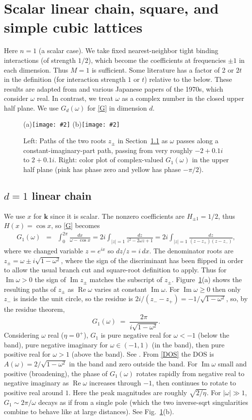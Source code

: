 \documentclass[11pt]{article}
\newcommand{\be}{\begin{equation}}
\newcommand{\ee}{\end{equation}}
\newcommand{\bea}{\begin{eqnarray}}
\newcommand{\eea}{\end{eqnarray}}
\newcommand{\bfi}{\begin{figure}}
\newcommand{\efi}{\end{figure}}
\newcommand{\ca}[2]{\caption{#1 \label{#2}}}
\newcommand{\ig}[2]{\texttt{[image: \#2]}}
\newcommand{\mbf}[1]{{\mathbf #1}}
\DeclareMathOperator{\re}{Re}
\DeclareMathOperator{\im}{Im}
\newcommand{\om}{\omega}
\newcommand{\kk}{\mbf{k}}
\begin{document}
\section{Scalar linear chain, square, and simple cubic lattices}

Here $n=1$ (a scalar case). We take fixed
nearest-neighbor tight binding interactions (of strength $1/2$), which become
the coefficients at frequencies $\pm 1$ in each dimension.
Thus $M=1$ is sufficient.
Some literature has
a factor of 2 or $2t$ in the definition (for interaction strength $1$ or $t$) relative to the below.
These results are adapted from \cite[Ch.~5]{economou}
and various Japanese papers of the 1970s, which consider $\om$ real.
In contrast, we treat $\om$ as a complex number in the closed
upper half plane.
We use $G_d(\om)$ for \eqref{G} in dimension $d$.


\bfi %
(a)\ig{width=2.8in}{zpaths}    %
(b)\ig{width=3.2in}{1dband_cplane}
\ca{Left: Paths of the two roots $z_\pm$ in Section~\ref{s:1d} as
  $\om$ passes along a constant-imaginary-part
  path, passing from very roughly $-2+0.1i$ to $2+0.1i$.
  Right: color plot of complex-valued $G_1(\om)$ in the upper half plane
  (pink has phase zero and yellow has phase $-\pi/2$).
}{f:1d}
\efi

\subsection{$d=1$ linear chain}
\label{s:1d}

We use $x$ for $\kk$ since it is scalar.
The nonzero coefficients are $H_{\pm 1} = 1/2$,
thus $H(x) = \cos x$,
so \eqref{G} becomes
\bea
G_1(\om) &=& \int_0^{2\pi} \frac{dx}{\om - \cos x}
= 2i \int_{|z|=1} \frac{dz}{z^2-2\om z + 1}
= 2i \int_{|z|=1} \frac{dz}{(z-z_+)(z-z_-)},
\label{G1def}
\eea
where we changed variable $z = e^{ix}$ so $dz/z = i\,dx$.
The denominator roots are $z_\pm = \om\pm i\sqrt{1-\om^2}$, where
the sign of the discriminant has been flipped in order to allow
the usual branch cut and square-root definition to apply.
Thus for $\im \om > 0$ the sign of $\im z_\pm$
matches the subscript of $z_\pm$.
Figure~\ref{f:1d}(a) shows the resulting paths of $z_\pm$ as $\re \om$
varies at constant $\im \om$.
For $\im \om \ge 0$ then only $z_-$ is inside the unit circle, so
the residue is $2i/(z_--z_+) = -1/\sqrt{1-\om^2}$, so, by
the residue theorem,
\be
G_1(\om) \;=\; \frac{2\pi}{i \sqrt{1-\om^2}}.
\label{G1}
\ee
Considering $\om$ real ($\eta=0^+$),
$G_1$ is pure negative real for $\om<-1$ (below the band),
pure negative imaginary for $\om \in (-1,1)$ (in the band),
then pure positive real for $\om>1$ (above the band).
See \cite[Fig.~5.6]{economou}.
From \eqref{DOS} the DOS is $A(\om) = 2/\sqrt{1-\om^2}$ in the band and zero
outside the band.
For $\im \om$ small and positive (broadening),
the phase of $G_1(\om)$ rotates rapidly from negative real to negative imaginary as
$\re\om$ increases through $-1$, then continues to rotate to positive real
around $1$.
Here the peak magnitudes are roughly $\sqrt{2/\eta}$.
For $|\om|\gg 1$, $G_1 \sim 2\pi/\om$ decays as if from
a single pole (which the two inverse-sqrt singularities combine to
behave like at large distances). See Fig.~\ref{f:1d}(b).
\end{document}

